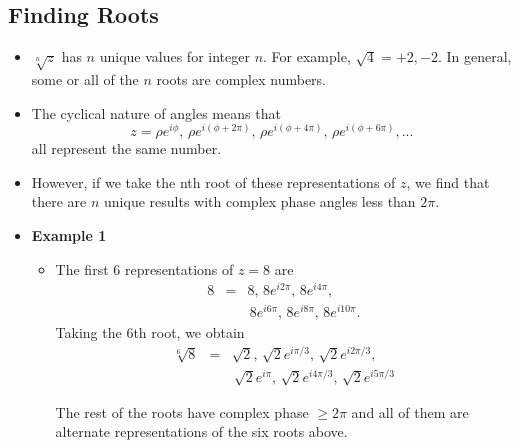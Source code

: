 \documentclass[12pt]{article}
\begin{document}
\subsection*{Finding Roots}
\begin{itemize}
\item $\sqrt[n]{z}$ has $n$ unique values for integer $n$. For
  example, $\sqrt{4} = +2, -2$. In general, some or all of the $n$ roots
  are complex numbers.

\item The cyclical nature of angles means that 
  \[
  z = \rho e^{i\phi},\,\rho e^{i(\phi + 2\pi)}, \,\rho e^{i(\phi + 4\pi)}, \,\rho e^{i(\phi + 6\pi)}, ...
  \]
  all represent the same number.

\item However, if we take the nth root of these representations of
  $z$, we find that there are $n$ unique results with complex phase
  angles less than $2 \pi$.

\item \textbf{Example 1}
  \begin{itemize}
  \item The first 6 representations of $z=8$ are
    \begin{eqnarray}
      \nonumber
      8 &=& 8, \,8e^{i2\pi}, \,8e^{i4\pi}, \\
      &&\,8e^{i6\pi}, \, 8e^{i8\pi}, \,8e^{i10\pi}.
    \end{eqnarray}
    Taking the 6th root, we obtain
    \begin{eqnarray}
      \nonumber
      \sqrt[6]{8} &=& \sqrt{2}, \,\sqrt{2} e^{i \pi/3}, 
      \,\sqrt{2}  e^{i 2\pi/3}, \\
      &&\,\sqrt{2}  e^{i \pi}, \,\sqrt{2}  e^{i 4\pi/3}, 
      \,\sqrt{2}  e^{i 5\pi/3}
    \end{eqnarray}

    The rest of the roots have complex phase $\geq 2\pi$ and all of them
    are alternate representations of the six roots above. 


\end{itemize}
\end{itemize}
\end{document}

